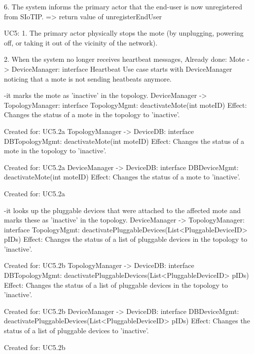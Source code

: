         6. The system informs the primary actor that the end-user is now unregistered from SIoTIP.
            => return value of unregisterEndUser


    UC5:
        1. The primary actor physically stops the mote (by unplugging, powering off, or taking it out of the vicinity of the network).

        2. When the system no longer receives heartbeat messages,
            Already done: Mote -> DeviceManager: interface Heartbeat
            Use case starts with DeviceManager noticing that a mote is not sending heatbeats anymore.

            -it marks the mote as 'inactive' in the topology.
                DeviceManager -> TopologyManager: interface TopologyMgmt: deactivateMote(int moteID)
                    Effect: Changes the status of a mote in the topology to 'inactive'.
                    \item Created for: UC5.2a
                TopologyManager -> DeviceDB: interface DBTopologyMgmt: deactivateMote(int moteID)
                    Effect: Changes the status of a mote in the topology to 'inactive'.
                    \item Created for: UC5.2a
                DeviceManager -> DeviceDB: interface DBDeviceMgmt: deactivateMote(int moteID)
                    Effect: Changes the status of a mote to 'inactive'.
                    \item Created for: UC5.2a

            -it looks up the pluggable devices that were attached to the affected mote and marks these as 'inactive' in the topology.
                DeviceManager -> TopologyManager: interface TopologyMgmt: deactivatePluggableDevices(List<PluggableDeviceID> pIDs)
                    Effect: Changes the status of a list of pluggable devices in the topology to 'inactive'.
                    \item Created for: UC5.2b
                TopologyManager -> DeviceDB: interface DBTopologyMgmt: deactivatePluggableDevices(List<PluggableDeviceID> pIDs)
                    Effect: Changes the status of a list of pluggable devices in the topology to 'inactive'.
                    \item Created for: UC5.2b
                DeviceManager -> DeviceDB: interface DBDeviceMgmt: deactivatePluggableDevices(List<PluggableDeviceID> pIDs)
                    Effect: Changes the status of a list of pluggable devices to 'inactive'.
                    \item Created for: UC5.2b

